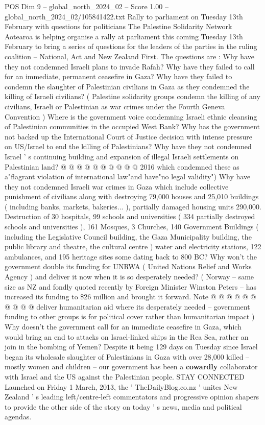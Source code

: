 \begin{textsample}{POS Dim 9 – global\_north\_2024\_02 – Score 1.00 – global\_north\_2024\_02/105841422.txt}  \label{ex:f9_pos_212}
Rally to parliament on Tuesday 13th February with questions for politicians The Palestine Solidarity Network Aotearoa is helping organise a rally at parliament this coming Tuesday 13th February to bring a series of questions for the leaders of the parties in the ruling coalition -- National, Act and New Zealand First.
The questions are : Why have they not condemned Israeli plans to invade Rafah?
Why have they failed to call for an immediate, permanent ceasefire in Gaza?
Why have they failed to condemn the slaughter of Palestinian civilians in Gaza as they condemned the killing of Israeli civilians? ( Palestine solidarity groups condemn the killing of any civilians, Israeli or Palestinian as war crimes under the Fourth Geneva Convention ) Where is the government voice condemning Israeli ethnic cleansing of Palestinian communities in the occupied West Bank?
Why has the government not backed up the International Court of Justice decision with intense pressure on US/Israel to end the killing of Palestinians?
Why have they not condemned Israel ' s continuing building and expansion of illegal Israeli settlements on Palestinian land? @ @ @ @ @ @ @ @ @ @ 2016 which condemned these as a"flagrant violation of international law"and have"no legal validity") Why have they not condemned Israeli war crimes in Gaza which include collective punishment of civilians along with destroying 79,000 houses and 25,010 buildings ( including banks, markets, bakeries... ), partially damaged housing units 290,000.
Destruction of 30 hospitals, 99 schools and universities ( 334 partially destroyed schools and universities ), 161 Mosques, 3 Churches, 140 Government Buildings ( including the Legislative Council building, the Gaza Municipality building, the public library and theatre, the cultural centre ) water and electricity stations, 122 ambulances, and 195 heritage sites some dating back to 800 BC?
Why won't the government double its funding for UNRWA ( United Nations Relief and Works Agency ) and deliver it now when it is so desperately needed? ( Norway -- same size as NZ and fondly quoted recently by Foreign Minister Winston Peters -- has increased its funding to \$26 million and brought it forward.
Note @ @ @ @ @ @ @ @ @ @ deliver humanitarian aid where its desperately needed -- government funding to other groups is for political cover rather than humanitarian impact ) Why doesn't the government call for an immediate ceasefire in Gaza, which would bring an end to attacks on Israel-linked ships in the Rea Sea, rather an join in the bombing of Yemen?
Despite it being 129 days on Tuesday since Israel began its wholesale slaughter of Palestinians in Gaza with over 28,000 killed -- mostly women and children -- our government has been a \textbf{cowardly} collaborator with Israel and the US against the Palestinian people.
STAY CONNECTED Launched on Friday 1 March, 2013, the ' TheDailyBlog.co.nz ' unites New Zealand ' s leading left/centre-left commentators and progressive opinion shapers to provide the other side of the story on today ' s news, media and political agendas.

\end{textsample}
